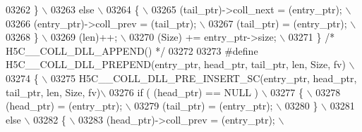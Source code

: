 \begin{DoxyCode}
03262 \textcolor{preprocessor}{    \}                                                                        \(\backslash\)}
03263 \textcolor{preprocessor}{    else                                                                     \(\backslash\)}
03264 \textcolor{preprocessor}{    \{                                                                        \(\backslash\)}
03265 \textcolor{preprocessor}{       (tail\_ptr)->coll\_next = (entry\_ptr);                                  \(\backslash\)}
03266 \textcolor{preprocessor}{       (entry\_ptr)->coll\_prev = (tail\_ptr);                                  \(\backslash\)}
03267 \textcolor{preprocessor}{       (tail\_ptr) = (entry\_ptr);                                             \(\backslash\)}
03268 \textcolor{preprocessor}{    \}                                                                        \(\backslash\)}
03269 \textcolor{preprocessor}{    (len)++;                                                                 \(\backslash\)}
03270 \textcolor{preprocessor}{    (Size) += entry\_ptr->size;                                               \(\backslash\)}
03271 \textcolor{preprocessor}{\} }\textcolor{comment}{/* H5C\_\_COLL\_DLL\_APPEND() */}\textcolor{preprocessor}{}
03272 
03273 \textcolor{preprocessor}{#define H5C\_\_COLL\_DLL\_PREPEND(entry\_ptr, head\_ptr, tail\_ptr, len, Size, fv)  \(\backslash\)}
03274 \textcolor{preprocessor}{\{                                                                            \(\backslash\)}
03275 \textcolor{preprocessor}{    H5C\_\_COLL\_DLL\_PRE\_INSERT\_SC(entry\_ptr, head\_ptr, tail\_ptr, len, Size, fv)\(\backslash\)}
03276 \textcolor{preprocessor}{    if ( (head\_ptr) == NULL )                                                \(\backslash\)}
03277 \textcolor{preprocessor}{    \{                                                                        \(\backslash\)}
03278 \textcolor{preprocessor}{       (head\_ptr) = (entry\_ptr);                                             \(\backslash\)}
03279 \textcolor{preprocessor}{       (tail\_ptr) = (entry\_ptr);                                             \(\backslash\)}
03280 \textcolor{preprocessor}{    \}                                                                        \(\backslash\)}
03281 \textcolor{preprocessor}{    else                                                                     \(\backslash\)}
03282 \textcolor{preprocessor}{    \{                                                                        \(\backslash\)}
03283 \textcolor{preprocessor}{       (head\_ptr)->coll\_prev = (entry\_ptr);                                  \(\backslash\)}

\end{DoxyCode}
